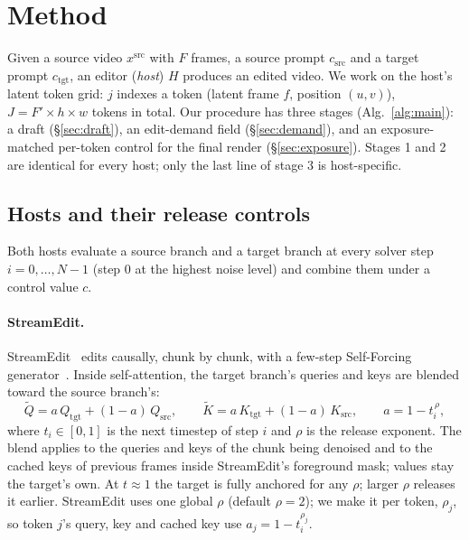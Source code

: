 \documentclass[10pt,twocolumn]{article}
\newcommand{\src}{\mathrm{src}}
\newcommand{\tgt}{\mathrm{tgt}}
\begin{document}
\section{Method}
\label{sec:method}

Given a source video $x^{\src}$ with $F$ frames, a source prompt $c_{\src}$ and a target prompt $c_{\tgt}$, an editor (\emph{host}) $H$ produces an edited video. We work on the host's latent token grid: $j$ indexes a token (latent frame $f$, position $(u,v)$), $J=F'\!\times h\times w$ tokens in total. Our procedure has three stages (Alg.~\ref{alg:main}): a draft (\S\ref{sec:draft}), an edit-demand field (\S\ref{sec:demand}), and an exposure-matched per-token control for the final render (\S\ref{sec:exposure}). Stages 1 and 2 are identical for every host; only the last line of stage 3 is host-specific.

\subsection{Hosts and their release controls}
\label{sec:hosts}

Both hosts evaluate a source branch and a target branch at every solver step $i=0,\dots,N-1$ (step $0$ at the highest noise level) and combine them under a control value $c$.

\paragraph{StreamEdit.}
StreamEdit~\cite{streamedit2026} edits causally, chunk by chunk, with a few-step Self-Forcing generator~\cite{selfforcing2025}. Inside self-attention, the target branch's queries and keys are blended toward the source branch's:
\begin{equation}
\tilde Q = a\,Q_{\tgt} + (1-a)\,Q_{\src},\qquad \tilde K = a\,K_{\tgt} + (1-a)\,K_{\src},\qquad a = 1 - t_{i}^{\,\rho},
\label{eq:se-blend}
\end{equation}
where $t_i\in[0,1]$ is the next timestep of step $i$ and $\rho$ is the release exponent. The blend applies to the queries and keys of the chunk being denoised and to the cached keys of previous frames inside StreamEdit's foreground mask; values stay the target's own. At $t\approx 1$ the target is fully anchored for any $\rho$; larger $\rho$ releases it earlier. StreamEdit uses one global $\rho$ (default $\rho=2$); we make it per token, $\rho_j$, so token $j$'s query, key and cached key use $a_j = 1-t_i^{\rho_j}$.
\end{document}
